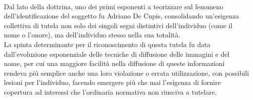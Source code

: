 \\Dal lato della dottrina, uno dei primi esponenti a teorizzare sul fenomeno dell'identificazione del soggetto fu Adriano De Cupis, consolidando un'esigenza collettiva di tutela non solo dei singoli segni distintivi dell'individuo (come il nome o l'onore), ma dell'individuo stesso nella sua totalità.
\\La spinta determinante per il riconoscimento di questa tutela fu data dall’evoluzione esponenziale delle tecniche di diffusione  delle immagini e del nome, per cui una maggiore facilità nella diffusione di queste informazioni rendeva più semplice anche una loro violazione o errata utilizzazione, con possibili lesioni per l'individuo, facendo emergere più che mai l’esigenza di fornire copertura ad interessi che l’ordinaria normativa non riusciva a tutelare.
